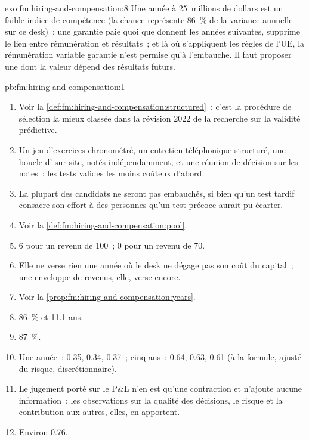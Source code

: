 \begin{solution}{exo:fm:hiring-and-compensation:8}
Une année à 25~millions de dollars est un faible indice de compétence (la chance représente 86~\% de la variance annuelle sur ce desk)~; une garantie paie quoi que donnent les années
suivantes, supprime le lien entre rémunération et résultats~; et là où s'appliquent les règles de l'UE, la rémunération variable garantie n'est permise qu'à l'embauche. Il faut proposer une 
dont la valeur dépend des résultats futurs.
\end{solution}

\begin{solution}{pb:fm:hiring-and-compensation:1}
\begin{enumerate}
\item Voir la \cref{def:fm:hiring-and-compensation:structured}~; c'est la procédure de sélection la mieux classée dans la révision 2022 de la recherche sur la
validité prédictive.
\item Un jeu d'exercices chronométré, un entretien téléphonique structuré, une boucle d' sur site, notés indépendamment, et une réunion de décision sur
les notes~: les tests valides les moins coûteux d'abord.
\item La plupart des candidats ne seront pas embauchés, si bien qu'un test tardif consacre son effort à des personnes qu'un test précoce aurait pu écarter.
\item Voir la \cref{def:fm:hiring-and-compensation:pool}.
\item 6 pour un revenu de 100~; 0 pour un revenu de 70.
\item Elle ne verse rien une année où le desk ne dégage pas son coût du capital~; une enveloppe de revenus, elle, verse encore.
\item Voir la \cref{prop:fm:hiring-and-compensation:years}.
\item 86~\% et 11.1 ans.
\item 87~\%.
\item Une année~: 0.35, 0.34, 0.37~; cinq ans~: 0.64, 0.63, 0.61 (à la formule, ajusté du risque, discrétionnaire).
\item Le jugement porté sur le P\&L n'en est qu'une contraction et n'ajoute aucune information~; les observations sur la qualité des décisions, le risque et la contribution aux autres, elles, en apportent.
\item Environ 0.76.

\end{enumerate}
\end{solution}
